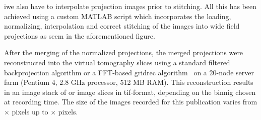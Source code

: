 iwe also have to interpolate projection images prior to stitching. All this has been achieved using a custom MATLAB\textsuperscript{\textregistered} script which incorporates the loading, normalizing, interpolation and correct stitching of the images into wide field projections as seem in the aforementioned figure.

After the merging of the normalized projections, the merged projections were reconstructed into the virtual tomography slices using a standard filtered backprojection algorithm or a FFT-based gridrec algorithm~\cite{Dowd2003} on a 20-node server farm (Pentium 4, 2.8 GHz processor, 512 MB RAM). This reconstruction results in an image stack of  or  image slices in tif-format, depending on the binnig chosen at recording time. The size of the images recorded for this publication varies from $\times$ pixels up to $\times$ pixels.